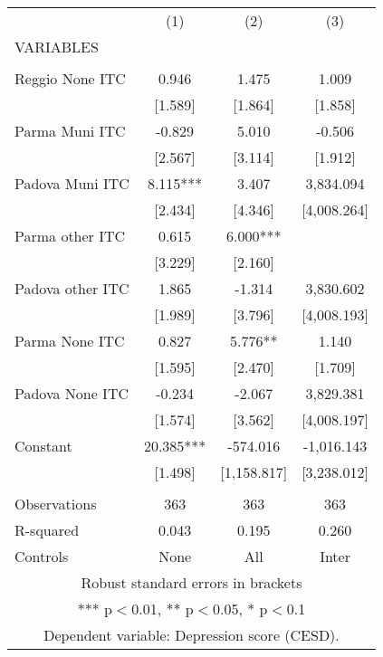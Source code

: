 \begin{tabular}{lccc} \hline
 & (1) & (2) & (3) \\
VARIABLES &  &  &  \\ \hline
 &  &  &  \\
Reggio None ITC & 0.946 & 1.475 & 1.009 \\
 & [1.589] & [1.864] & [1.858] \\
Parma Muni ITC & -0.829 & 5.010 & -0.506 \\
 & [2.567] & [3.114] & [1.912] \\
Padova Muni ITC & 8.115*** & 3.407 & 3,834.094 \\
 & [2.434] & [4.346] & [4,008.264] \\
Parma other ITC & 0.615 & 6.000*** &  \\
 & [3.229] & [2.160] &  \\
Padova other ITC & 1.865 & -1.314 & 3,830.602 \\
 & [1.989] & [3.796] & [4,008.193] \\
Parma None ITC & 0.827 & 5.776** & 1.140 \\
 & [1.595] & [2.470] & [1.709] \\
Padova None ITC & -0.234 & -2.067 & 3,829.381 \\
 & [1.574] & [3.562] & [4,008.197] \\
Constant & 20.385*** & -574.016 & -1,016.143 \\
 & [1.498] & [1,158.817] & [3,238.012] \\
 &  &  &  \\
Observations & 363 & 363 & 363 \\
R-squared & 0.043 & 0.195 & 0.260 \\
 Controls & None & All & Inter \\ \hline
\multicolumn{4}{c}{ Robust standard errors in brackets} \\
\multicolumn{4}{c}{ *** p$<$0.01, ** p$<$0.05, * p$<$0.1} \\
\multicolumn{4}{c}{ Dependent variable: Depression score (CESD).} \\
\end{tabular}
